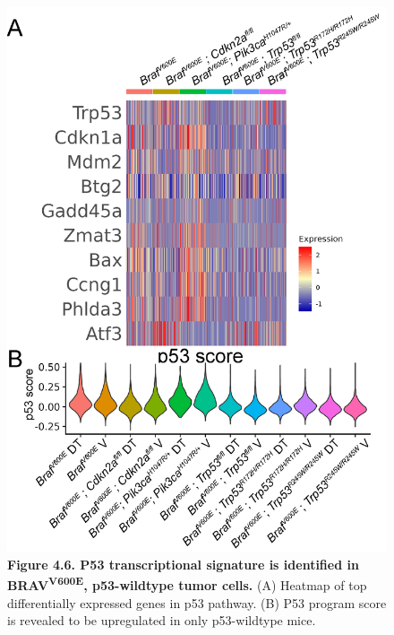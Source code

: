 \begin{figure}
\hypertarget{fig:04}{%
\centering
\includegraphics[width=1\textwidth,height=\textheight]{images/scrna_6.png}
\caption{\textbf{Figure 4.6. P53 transcriptional signature is identified in BRAV\textsuperscript{V600E}, p53-wildtype tumor cells.} (A) Heatmap of top differentially expressed genes in p53 pathway. (B) P53 program score is revealed to be upregulated in only p53-wildtype mice.}\label{fig:04}
}
\end{figure}

